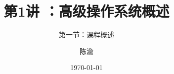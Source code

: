 


\title[第1讲]{第1讲 ：高级操作系统概述} %
\subtitle{第一节：课程概述}
\author{陈渝} %
\date{\today} %




\begin{frame}
\titlepage %
\end{frame}


